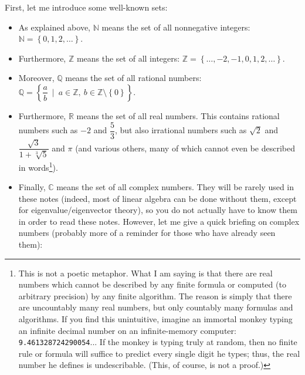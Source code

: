 \documentclass[numbers=enddot,12pt,final,onecolumn,notitlepage]{scrartcl}%
\theoremstyle{definition}
\begin{document}
First, let me introduce some well-known sets:

\begin{itemize}
\item As explained above, $\mathbb{N}$ means the set of all nonnegative
integers: $\mathbb{N}=\left\{  0,1,2,\ldots\right\}  $.

\item Furthermore, $\mathbb{Z}$ means the set of all integers: $\mathbb{Z}%
=\left\{  \ldots,-2,-1,0,1,2,\ldots\right\}  $.

\item Moreover, $\mathbb{Q}$ means the set of all rational numbers:
$\mathbb{Q}=\left\{  \dfrac{a}{b}\ \mid\ a\in\mathbb{Z},\ b\in\mathbb{Z}%
\setminus\left\{  0\right\}  \right\}  $.

\item Furthermore, $\mathbb{R}$ means the set of all real numbers. This
contains rational numbers such as $-2$ and $\dfrac{5}{3}$, but also irrational
numbers such as $\sqrt{2}$ and $\dfrac{\sqrt{3}}{1+\sqrt[3]{5}}$ and $\pi$
(and various others, many of which cannot even be described in
words\footnote{This is not a poetic metaphor. What I am saying is that there
are real numbers which cannot be described by any finite formula or computed
(to arbitrary precision) by any finite algorithm. The reason is simply that
there are uncountably many real numbers, but only countably many formulas and
algorithms. If you find this unintuitive, imagine an immortal monkey typing an
infinite decimal number on an infinite-memory computer:
\texttt{9.461328724290054}... If the monkey is typing truly at random, then no
finite rule or formula will suffice to predict every single digit he types;
thus, the real number he defines is undescribable. (This, of course, is not a
proof.)}).

\item Finally, $\mathbb{C}$ means the set of all complex numbers. They will be
rarely used in these notes (indeed, most of linear algebra can be done without
them, except for eigenvalue/eigenvector theory), so you do not actually have
to know them in order to read these notes. However, let me give a quick
briefing on complex numbers (probably more of a reminder for those who have
already seen them):


\end{itemize}
\end{document}
